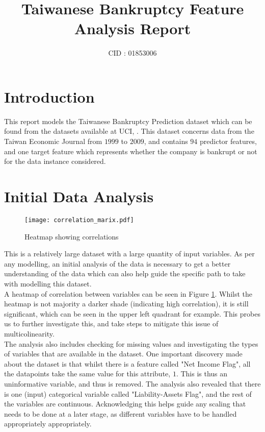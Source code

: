 \documentclass[11pt]{article}
\title{Taiwanese Bankruptcy Feature Analysis Report}
\date{}
\author{CID : 01853006}
\begin{document}
\maketitle

\section{Introduction}

This report models the Taiwanese Bankruptcy Prediction dataset which can be found from the datasets available at UCI, \cite{taiwanese_bankruptcy_dataset}. This dataset concerns data from the Taiwan Economic Journal from $1999$ to $2009$, and contains $94$ predictor features, and one target feature which represents whether the company is bankrupt or not for the data instance considered. 

\section{Initial Data Analysis}\label{EDA}
\begin{figure}
    \centering
    \texttt{[image: correlation\_marix.pdf]}
    \caption{Heatmap showing correlations}
    \label{fig:CorrelationMatrix}
\end{figure}
This is a relatively large dataset with a large quantity of input variables. As per any modelling, an initial analysis of the data is necessary to get a better understanding of the data which can also help guide the specific path to take with modelling this dataset. \\

A heatmap of correlation between variables can be seen in Figure \ref{fig:CorrelationMatrix}. Whilst the heatmap is not majority a darker shade (indicating high correlation), it is still significant, which can be seen in the upper left quadrant for example. This probes us to further investigate this, and take steps to mitigate this issue of multicolinearity. \\

The analysis also includes checking for missing values and investigating the types of variables that are available in the dataset. One important discovery made about the dataset is that whilst there is a feature called "Net Income Flag", all the datapoints take the same value for this attribute, $1$. This is thus an uninformative variable, and thus is removed. The analysis also revealed that there is one (input) categorical variable called "Liability-Assets Flag", and the rest of the variables are continuous. Acknowledging this helps guide any scaling that needs to be done at a later stage, as different variables have to be handled appropriately appropriately. \\
\end{document}
